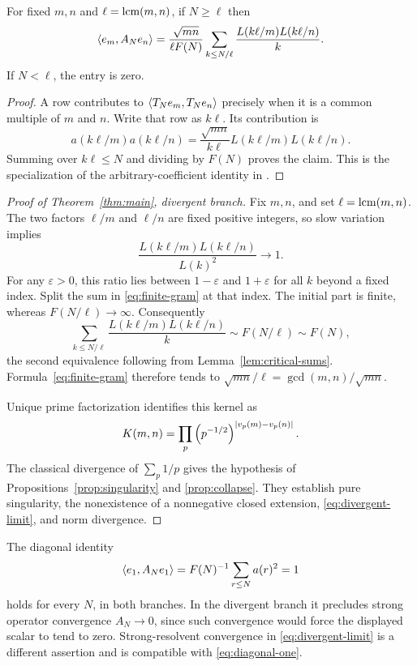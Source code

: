 \begin{lemma}
\label{lem:gram}
For fixed $m,n$ and $\ell=\operatorname{lcm}(m,n)$, if $N\ge\ell$ then
\begin{equation}
 \langle e_m,A_Ne_n\rangle
 =\frac{\sqrt{mn}}{\ell F(N)}
   \sum_{k\le N/\ell}
   \frac{L(k\ell/m)L(k\ell/n)}{k}.
 \label{eq:finite-gram}
\end{equation}
If $N<\ell$, the entry is zero.
\end{lemma}
\begin{proof}
A row contributes to $\langle T_Ne_m,T_Ne_n\rangle$ precisely when it is
a common multiple of $m$ and $n$. Write that row as $k\ell$.
Its contribution is
\[
 a(k\ell/m)a(k\ell/n)
 =\frac{\sqrt{mn}}{k\ell}
   L(k\ell/m)L(k\ell/n).
\]
Summing over $k\ell\le N$ and dividing by $F(N)$ proves the claim.
This is the specialization of the arbitrary-coefficient identity in
\citet[Proposition~2.1]{hilberdink2017singular}.
\end{proof}

\begin{proof}[Proof of Theorem~\ref{thm:main}, divergent branch]
Fix $m,n$, and set $\ell=\operatorname{lcm}(m,n)$.
The two factors $\ell/m$ and $\ell/n$ are fixed positive integers, so
slow variation implies
\[
 \frac{L(k\ell/m)L(k\ell/n)}{L(k)^2}\longrightarrow1.
\]
For any $\varepsilon>0$, this ratio lies between $1-\varepsilon$
and $1+\varepsilon$ for all $k$ beyond a fixed index.
Split the sum in \eqref{eq:finite-gram} at that index.
The initial part is finite, whereas $F(N/\ell)\to\infty$.
Consequently
\[
 \sum_{k\le N/\ell}
 \frac{L(k\ell/m)L(k\ell/n)}{k}
 \sim F(N/\ell)\sim F(N),
\]
the second equivalence following from Lemma~\ref{lem:critical-sums}.
Formula~\eqref{eq:finite-gram} therefore tends to
$\sqrt{mn}/\ell=\gcd(m,n)/\sqrt{mn}$.

Unique prime factorization identifies this kernel as
\[
 K(m,n)=\prod_p
 \left(p^{-1/2}\right)^{\lvert v_p(m)-v_p(n)\rvert}.
\]
The classical divergence of $\sum_p1/p$ gives the hypothesis of
Propositions~\ref{prop:singularity} and \ref{prop:collapse}.
They establish pure singularity, the nonexistence of a nonnegative
closed extension, \eqref{eq:divergent-limit}, and norm divergence.
\end{proof}

The diagonal identity
\begin{equation}
 \langle e_1,A_Ne_1\rangle
 =F(N)^{-1}\sum_{r\le N}a(r)^2=1
 \label{eq:diagonal-one}
\end{equation}
holds for every $N$, in both branches.
In the divergent branch it precludes strong operator convergence
$A_N\to0$, since such convergence would force the displayed scalar
to tend to zero. Strong-resolvent convergence in
\eqref{eq:divergent-limit} is a different assertion and is compatible
with \eqref{eq:diagonal-one}.
